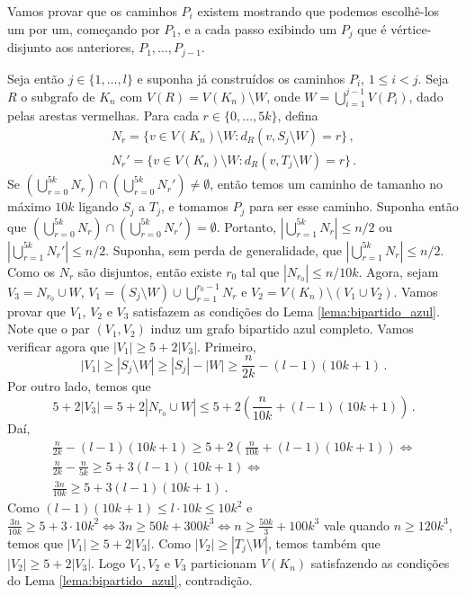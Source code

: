 \begin{dem}
	Vamos provar que os caminhos $P_i$ existem mostrando que podemos escolhê-los um por um, começando por $P_1$, e a cada passo exibindo um $P_j$ que é vértice-disjunto aos anteriores, $P_1, \dots, P_{j-1}$.
	
	Seja então $j\in \{1,\dots, l\}$ e suponha já construídos os caminhos $P_i$, $1\leq i<j$. Seja $R$ o subgrafo de $K_n$ com $V(R) = V(K_n)\setminus W$, onde $W = \bigcup_{i=1}^{j-1} V(P_i)$, dado pelas arestas vermelhas. Para cada $r\in\{0,\dots,5k\}$, defina
	\begin{align*}
		N_r = \{v\in V(K_n)\setminus W: d_R(v, S_j\setminus W) = r\} \,,\\
		N_r' = \{v\in V(K_n)\setminus W: d_R(v, T_j\setminus W) = r\}\,.
	\end{align*}
	Se $(\bigcup_{r=0}^{5k}N_r) \cap (\bigcup_{r=0}^{5k}N_r')\neq \emptyset$, então temos um caminho de tamanho no máximo $10k$ ligando $S_j$ a $T_j$, e tomamos $P_j$ para ser esse caminho. Suponha então que $(\bigcup_{r=0}^{5k}N_r)\cap(\bigcup_{r=0}^{5k}N_r') = \emptyset$. Portanto, $|\bigcup_{r=1}^{5k}N_r|\leq n/2$ ou $|\bigcup_{r=1}^{5k}N_r'|\leq n/2$. Suponha, sem perda de generalidade, que $|\bigcup_{r=1}^{5k}N_r|\leq n/2$. Como os $N_r$ são disjuntos, então existe $r_0$ tal que $|N_{r_0}|\leq n/10k$. Agora, sejam $V_3 = N_{r_0}\cup W$, $V_1 = (S_j\setminus W)\cup \bigcup_{r=1}^{r_0-1}N_r$ e $V_2 = V(K_n)\setminus (V_1\cup V_2)$. Vamos provar que $V_1$, $V_2$ e $V_3$ satisfazem as condições do Lema \ref{lema:bipartido_azul}. Note que o par $(V_1, V_2)$ induz um grafo bipartido azul completo. Vamos verificar agora que $|V_1|\geq 5 + 2|V_3|$. Primeiro, 
	\[
		|V_1| \geq |S_j\setminus W| \geq |S_j| - |W| \geq \frac{n}{2k} - (l-1)(10k+1)\,.
	\] 
	Por outro lado, temos que 
	\[
		5 + 2|V_3| = 5 + 2|N_{r_0}\cup W| \leq 5 + 2\left(\frac{n}{10k} + (l-1)(10k+1)\right)\,.
	\]
	Daí, 
	\begin{gather}
		\frac{n}{2k} - (l-1)(10k+1)\geq 5 + 2\left(\frac{n}{10k} + (l-1)(10k+1)\right) \Longleftrightarrow \nonumber\\
		\frac{n}{2k} - \frac{n}{5k} \geq 5 + 3(l-1)(10k+1)\Longleftrightarrow \nonumber\\
		\frac{3n}{10k} \geq 5 + 3(l-1)(10k+1)\,.  \label{eqn1}
 	\end{gather}
	Como $(l-1)(10k+1)\leq l\cdot10k\leq 10k^2$ e $\frac{3n}{10k}\geq 5 + 3\cdot10k^2 \Leftrightarrow 3n\geq 50k + 300k^3\Leftrightarrow n\geq \frac{50k}{3} + 100k^3$ vale quando $n\geq 120k^3$, temos que $|V_1|\geq 5 + 2|V_3|$. Como $|V_2|\geq |T_j\setminus W|$, temos também que $|V_2|\geq 5 + 2|V_3|$. Logo $V_1, V_2$ e $V_3$ particionam $V(K_n)$ satisfazendo as condições do Lema \ref{lema:bipartido_azul}, contradição.
\end{dem}

